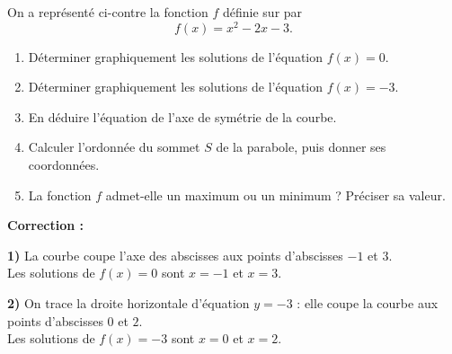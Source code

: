 \documentclass[11pt,a4paper]{book}
\begin{document}
\begin{minipage}[c]{0.5\linewidth}
	On a représenté ci-contre la fonction $f$ définie sur \R par
	$$f(x)=x^2-2x-3.$$
	\begin{enumerate}[label=\textbf{\arabic*)}]
		\item Déterminer graphiquement les solutions de l'équation $f(x)=0$.
		\item Déterminer graphiquement les solutions de l'équation $f(x)=-3$.
		\item En déduire l'équation de l'axe de symétrie de la courbe.
		\item Calculer l'ordonnée du sommet $S$ de la parabole, puis donner ses coordonnées.
		\item La fonction $f$ admet-elle un maximum ou un minimum ? Préciser sa valeur.
	\end{enumerate}
\end{minipage} \hfill
\begin{minipage}[c]{0.46\linewidth}
	\begin{center}
	\end{center}
\end{minipage}

\medskip
\noindent\textbf{\color{red!75!black}Correction :}

\smallskip
\begin{corrBox}
	\textbf{1)} La courbe coupe l'axe des abscisses aux points d'abscisses $-1$ et $3$.\\
	Les solutions de $f(x)=0$ sont $x=-1$ et $x=3$.
\end{corrBox}

\medskip
\begin{corrBox}
	\textbf{2)} On trace la droite horizontale d'équation $y=-3$ : elle coupe la courbe aux points d'abscisses $0$ et $2$.\\
	Les solutions de $f(x)=-3$ sont $x=0$ et $x=2$.
\end{corrBox}
\end{document}
